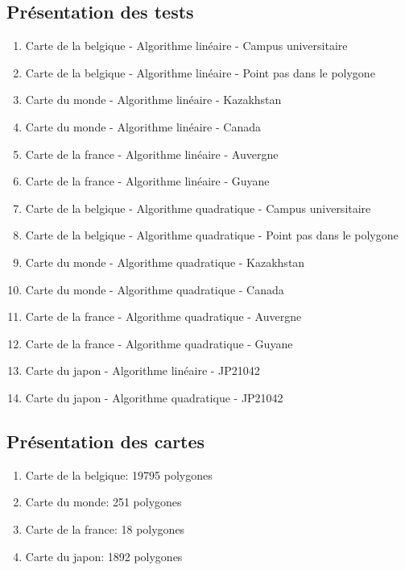 \documentclass[utf8]{article}
\begin{document}
\begin{large}
    \subsection{Présentation des tests}
    \begin{enumerate}
        \item Carte de la belgique - Algorithme linéaire - Campus universitaire
        \item Carte de la belgique - Algorithme linéaire - Point pas dans le polygone
        \item Carte du monde - Algorithme linéaire - Kazakhstan
        \item Carte du monde - Algorithme linéaire - Canada
        \item Carte de la france - Algorithme linéaire - Auvergne
        \item Carte de la france - Algorithme linéaire - Guyane
        \item Carte de la belgique - Algorithme quadratique - Campus universitaire
        \item Carte de la belgique - Algorithme quadratique - Point pas dans le polygone
        \item Carte du monde - Algorithme quadratique - Kazakhstan
        \item Carte du monde - Algorithme quadratique - Canada
        \item Carte de la france - Algorithme quadratique - Auvergne
        \item Carte de la france - Algorithme quadratique - Guyane
        \item Carte du japon - Algorithme linéaire - JP21042
        \item Carte du japon - Algorithme quadratique - JP21042
    \end{enumerate}

    \subsection{Présentation des cartes}
    \begin{enumerate}
        \item Carte de la belgique: 19795 polygones
        \item Carte du monde: 251 polygones
        \item Carte de la france: 18 polygones
        \item Carte du japon: 1892 polygones
    \end{enumerate}


\end{large}
\end{document}
